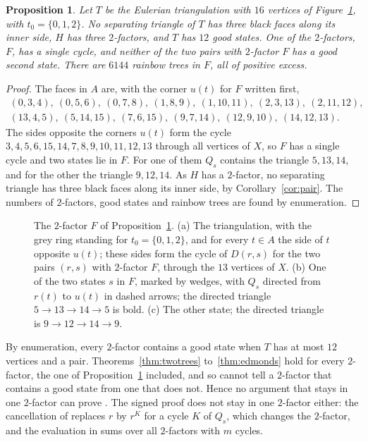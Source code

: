 \documentclass[10pt]{amsart}
\numberwithin{equation}{section}
\newtheorem{proposition}[equation]{Proposition}
\theoremstyle{definition}
\theoremstyle{remark}
\begin{document}
\begin{proposition}\label{prop:bad}
Let $T$ be the Eulerian triangulation with $16$ vertices of Figure~\ref{fig:bad}, with $t_0=\{0,1,2\}$.
No separating triangle of $T$ has three black faces along its inner side, $H$ has three $2$-factors, and $T$ has $12$ good states.
One of the $2$-factors, $F$, has a single cycle, and neither of the two pairs with $2$-factor $F$ has a good second state.
There are $6144$ rainbow trees in $F$, all of positive excess.
\end{proposition}

\begin{proof}
The faces in $A$ are, with the corner $u(t)$ for $F$ written first,
\begin{gather*}
(0,3,4),\ (0,5,6),\ (0,7,8),\ (1,8,9),\ (1,10,11),\ (2,3,13),\ (2,11,12),\\
(13,4,5),\ (5,14,15),\ (7,6,15),\ (9,7,14),\ (12,9,10),\ (14,12,13).
\end{gather*}
The sides opposite the corners $u(t)$ form the cycle $3,4,5,6,15,14,7,8,9,10,11,12,13$ through all vertices of $X$, so $F$ has a single cycle and two states lie in $F$.
For one of them $Q_s$ contains the triangle $5,13,14$, and for the other the triangle $9,12,14$.
As $H$ has a $2$-factor, no separating triangle has three black faces along its inner side, by Corollary~\ref{cor:pair}.
The numbers of $2$-factors, good states and rainbow trees are found by enumeration.
\end{proof}

\begin{figure}[H]
\centering
\scalebox{.85}{\begin{minipage}{\textwidth}\centering\end{minipage}}
\caption{The $2$-factor $F$ of Proposition~\ref{prop:bad}. (a) The triangulation, with the grey ring standing for $t_0=\{0,1,2\}$, and for every $t\in A$ the side of $t$ opposite $u(t)$; these sides form the cycle of $D(r,s)$ for the two pairs $(r,s)$ with $2$-factor $F$, through the $13$ vertices of $X$. (b) One of the two states $s$ in $F$, marked by wedges, with $Q_s$ directed from $r(t)$ to $u(t)$ in dashed arrows; the directed triangle $5\to13\to14\to5$ is bold. (c) The other state; the directed triangle is $9\to12\to14\to9$.}
\label{fig:bad}
\end{figure}

By enumeration, every $2$-factor contains a good state when $T$ has at most $12$ vertices and a pair.
Theorems~\ref{thm:twotrees} to~\ref{thm:edmonds} hold for every $2$-factor, the one of Proposition~\ref{prop:bad} included, and so cannot tell a $2$-factor that contains a good state from one that does not.
Hence no argument that stays in one $2$-factor can prove \cite[Proposition~6.9]{Paper}.
The signed proof does not stay in one $2$-factor either: the cancellation of \cite[Lemma~5.6]{Paper} replaces $r$ by $r^K$ for a cycle $K$ of $Q_s$, which changes the $2$-factor, and the evaluation in \cite[Proposition~6.9]{Paper} sums over all $2$-factors with $m$ cycles.
\end{document}

